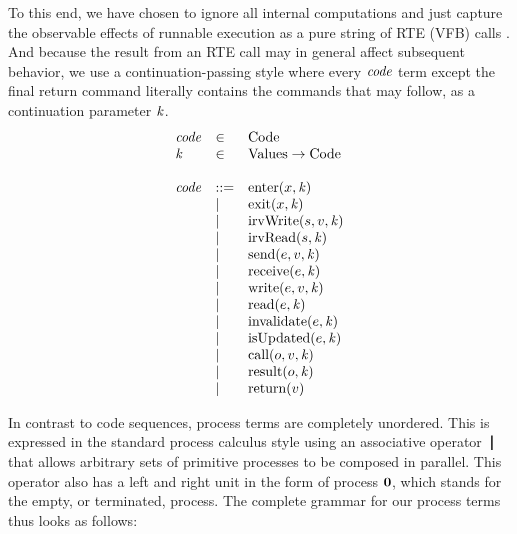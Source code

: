 \documentclass[10pt,conference]{IEEEtran}
\begin{document}
To this end, we have chosen to ignore all internal computations and just capture the observable effects of runnable execution as a pure string of RTE (VFB) calls \cite[ch.~5.6]{AR:RTE}. And because the result from an RTE call may in general affect subsequent behavior, we use a continuation-passing style \cite{Reynolds93} where every $\Code$ term except the final return command literally contains the commands that may follow, as a continuation parameter $\Cont$.
%
\[
\begin{array}{lll}
  \Code & \in & \text{Code}                \\
  \Cont & \in & \text{Values} \rightarrow \text{Code}   \\ \\
  \Code & ::= & \Enter x \Cont               \\
        & |   & \Exit x \Cont                \\
        & |   & \IrvWrite s v \Cont          \\
        & |   & \IrvRead s \Cont             \\
        & |   & \Send e v \Cont      \\
        & |   & \Receive e \Cont     \\
        & |   & \Write e v \Cont     \\
        & |   & \Read e \Cont        \\
        & |   & \Invalidate e \Cont  \\
        & |   & \IsUpdated e \Cont   \\
        & |   & \Call o v \Cont      \\
        & |   & \Result o \Cont      \\
        & |   & \Return v                    \\
\end{array}
\]

In contrast to code sequences, process terms are completely unordered. This is expressed in the standard process calculus style using an associative operator $\Tpar{}{}$ that allows arbitrary sets of primitive processes to be composed in parallel. This operator also has a left and right unit in the form of process $\textbf{0}$, which stands for the empty, or terminated, process. The complete grammar for our process terms thus looks as follows:
\end{document}
